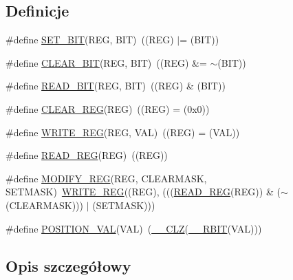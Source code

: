 \subsection*{Definicje}
\begin{DoxyCompactItemize}
\item 
\#define \hyperlink{group___exported__macro_ga26474f43799fbade9cf300e21dd3a91a}{S\+E\+T\+\_\+\+B\+IT}(R\+EG,  B\+IT)~((R\+EG) $\vert$= (B\+IT))
\item 
\#define \hyperlink{group___exported__macro_ga133aae6fc0d41bffab39ab223a7001de}{C\+L\+E\+A\+R\+\_\+\+B\+IT}(R\+EG,  B\+IT)~((R\+EG) \&= $\sim$(B\+IT))
\item 
\#define \hyperlink{group___exported__macro_ga822bb1bb9710d5f2fa6396b84e583c33}{R\+E\+A\+D\+\_\+\+B\+IT}(R\+EG,  B\+IT)~((R\+EG) \& (B\+IT))
\item 
\#define \hyperlink{group___exported__macro_ga1378fbdda39f40b85420df55f41460ef}{C\+L\+E\+A\+R\+\_\+\+R\+EG}(R\+EG)~((R\+EG) = (0x0))
\item 
\#define \hyperlink{group___exported__macro_ga32f78bffcaf6d13023dcd7f05e0c4d57}{W\+R\+I\+T\+E\+\_\+\+R\+EG}(R\+EG,  V\+AL)~((R\+EG) = (V\+AL))
\item 
\#define \hyperlink{group___exported__macro_gae7f188a4d26c9e713a48414783421071}{R\+E\+A\+D\+\_\+\+R\+EG}(R\+EG)~((R\+EG))
\item 
\#define \hyperlink{group___exported__macro_ga6553c99f510c3bab8cc0a91602053247}{M\+O\+D\+I\+F\+Y\+\_\+\+R\+EG}(R\+EG,  C\+L\+E\+A\+R\+M\+A\+SK,  S\+E\+T\+M\+A\+SK)~\hyperlink{group___exported__macro_ga32f78bffcaf6d13023dcd7f05e0c4d57}{W\+R\+I\+T\+E\+\_\+\+R\+EG}((R\+EG), (((\hyperlink{group___exported__macro_gae7f188a4d26c9e713a48414783421071}{R\+E\+A\+D\+\_\+\+R\+EG}(R\+EG)) \& ($\sim$(C\+L\+E\+A\+R\+M\+A\+SK))) $\vert$ (S\+E\+T\+M\+A\+SK)))
\item 
\#define \hyperlink{group___exported__macro_ga47a8870d71d55cefb3df47cd8c815ec8}{P\+O\+S\+I\+T\+I\+O\+N\+\_\+\+V\+AL}(V\+AL)~(\hyperlink{group___c_m_s_i_s___core___instruction_interface_ga5d5bb1527e042be4a9fa5a33f65cc248}{\+\_\+\+\_\+\+C\+LZ}(\hyperlink{group___c_m_s_i_s___core___instruction_interface_gaf944a7b7d8fd70164cca27669316bcf7}{\+\_\+\+\_\+\+R\+B\+IT}(V\+AL)))
\end{DoxyCompactItemize}


\subsection{Opis szczegółowy}



